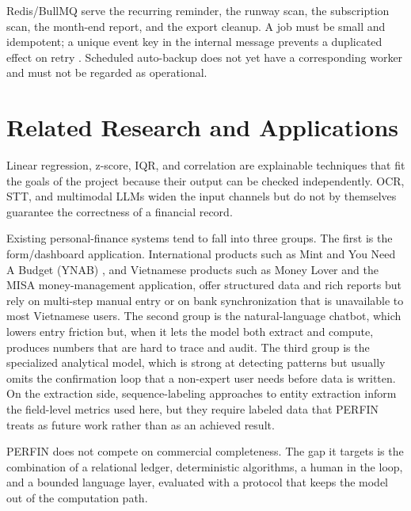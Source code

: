 Redis/BullMQ serve the recurring reminder, the runway scan, the
subscription scan, the month-end report, and the export cleanup. A job
must be small and idempotent; a unique event key in the internal message
prevents a duplicated effect on retry \cite{bullmq2026}. Scheduled
auto-backup does not yet have a corresponding worker and must not be
regarded as operational.

\section{Related Research and Applications}

Linear regression, z-score, IQR, and correlation are explainable
techniques that fit the goals of the project because their output can be
checked independently. OCR, STT, and multimodal LLMs widen the input
channels but do not by themselves guarantee the correctness of a
financial record.

Existing personal-finance systems tend to fall into three groups. The
first is the form/dashboard application. International products such as
Mint \cite{mint2023} and You Need A Budget (YNAB) \cite{ynab2024}, and
Vietnamese products such as Money Lover \cite{moneylover2024} and the
MISA money-management application, offer structured data and rich
reports but rely on multi-step manual entry or on bank synchronization
that is unavailable to most Vietnamese users. The second group is the
natural-language chatbot, which lowers entry friction but, when it lets
the model both extract and compute, produces numbers that are hard to
trace and audit. The third group is the specialized analytical model,
which is strong at detecting patterns but usually omits the
confirmation loop that a non-expert user needs before data is written.
On the extraction side, sequence-labeling approaches to entity
extraction \cite{lample2016} inform the field-level metrics used here,
but they require labeled data that PERFIN treats as future work rather
than as an achieved result.

PERFIN does not compete on commercial completeness. The gap it targets
is the combination of a relational ledger, deterministic algorithms, a
human in the loop, and a bounded language layer, evaluated with a
protocol that keeps the model out of the computation path.

